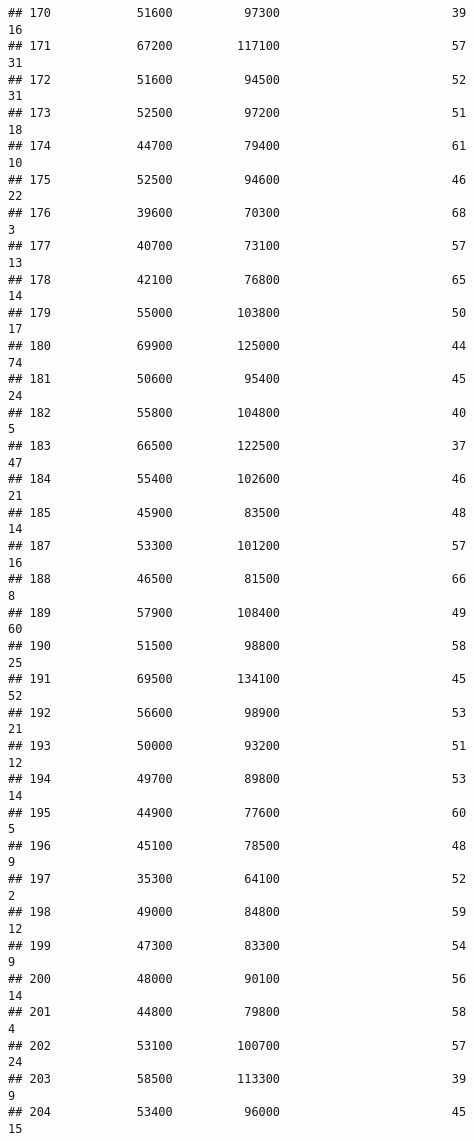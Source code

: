 \documentclass[
]{article}
\begin{document}
\begin{verbatim}
## 170            51600          97300                        39           16
## 171            67200         117100                        57           31
## 172            51600          94500                        52           31
## 173            52500          97200                        51           18
## 174            44700          79400                        61           10
## 175            52500          94600                        46           22
## 176            39600          70300                        68            3
## 177            40700          73100                        57           13
## 178            42100          76800                        65           14
## 179            55000         103800                        50           17
## 180            69900         125000                        44           74
## 181            50600          95400                        45           24
## 182            55800         104800                        40            5
## 183            66500         122500                        37           47
## 184            55400         102600                        46           21
## 185            45900          83500                        48           14
## 187            53300         101200                        57           16
## 188            46500          81500                        66            8
## 189            57900         108400                        49           60
## 190            51500          98800                        58           25
## 191            69500         134100                        45           52
## 192            56600          98900                        53           21
## 193            50000          93200                        51           12
## 194            49700          89800                        53           14
## 195            44900          77600                        60            5
## 196            45100          78500                        48            9
## 197            35300          64100                        52            2
## 198            49000          84800                        59           12
## 199            47300          83300                        54            9
## 200            48000          90100                        56           14
## 201            44800          79800                        58            4
## 202            53100         100700                        57           24
## 203            58500         113300                        39            9
## 204            53400          96000                        45           15

\end{verbatim}
\end{document}
